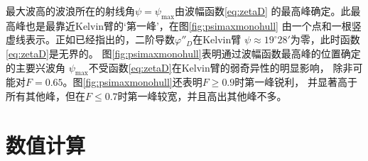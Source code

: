 最大波高的波浪所在的射线角$\psi=\psi_{\max}$由波幅函数\eqref{eq:zetaD}
的最高峰确定。此最高峰也是最靠近Kelvin臂的`第一峰'，在图\ref{fig:psimaxmonohull}
由一个点和一根竖虚线表示。正如已经指出的，二阶导数$\varphi''_D$在Kelvin臂
$\psi\approx19^\circ28'$为零，此时函数\eqref{eq:zetaD}是无界的。
图\ref{fig:psimaxmonohull}表明通过波幅函数最高峰的位置确定的主要兴波角
$\psi_{\max}$不受函数\eqref{eq:zetaD}在Kelvin臂的弱奇异性的明显影响，
除非可能对$F=0.65$。图\ref{fig:psimaxmonohull}还表明$F\ge0.9$时第一峰锐利，
并显著高于所有其他峰，但在$F\le0.7$时第一峰较宽，并且高出其他峰不多。

\section{数值计算}
\label{sec:numcomput}



